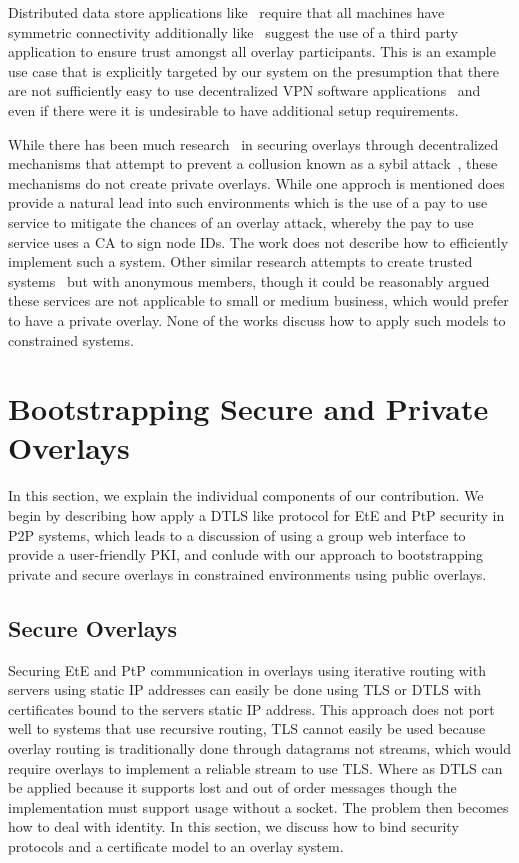\documentclass[conference]{IEEEtran}
\begin{document}
Distributed data store applications like~\cite{dynamo, bigtable} require that
all machines have symmetric connectivity additionally like~\cite{past} suggest
the use of a third party application to ensure trust amongst all overlay
participants.  This is an example use case that is explicitly targeted by our
system on the presumption that there are not sufficiently easy to use
decentralized VPN software applications~\cite{sc09, nsdi10} and even if there
were it is undesirable to have additional setup requirements.

While there has been much research~\cite{secure_routing} in securing overlays
through decentralized mechanisms that attempt to prevent a collusion known as
a sybil attack~\cite{sybil}, these mechanisms do not create private overlays.
While one approch is mentioned does provide a natural lead into such
environments which is the use of a pay to use service to mitigate the chances
of an overlay attack, whereby the pay to use service uses a CA to sign node
IDs.  The work does not describe how to efficiently implement such a system.
Other similar research attempts to create trusted systems~\cite{stone, tor} but
with anonymous members, though it could be reasonably argued these services are
not applicable to small or medium business, which would prefer to have a private
overlay.  None of the works discuss how to apply such models to constrained
systems.

\section{Bootstrapping Secure and Private Overlays}
\label{contributions}
In this section, we explain the individual components of our contribution.  We
begin by describing how apply a DTLS like protocol for EtE and PtP security in
P2P systems, which leads to a discussion of using a group web interface to
provide a user-friendly PKI, and conlude with our approach to bootstrapping
private and secure overlays in constrained environments using public overlays.

\subsection{Secure Overlays}
\label{secure_overlays}
Securing EtE and PtP communication in overlays using iterative routing with
servers using static IP addresses can easily be done using TLS or DTLS with
certificates bound to the servers static IP address.  This approach does not
port well to systems that use recursive routing, TLS cannot easily be used
because overlay routing is traditionally done through datagrams not streams,
which would require overlays to implement a reliable stream to use TLS.  Where
as DTLS can be applied because it supports lost and out of order messages though
the implementation must support usage without a socket.  The
problem then becomes how to deal with identity.  In this section, we discuss how
to bind security protocols and a certificate model to an overlay system.
\end{document}
